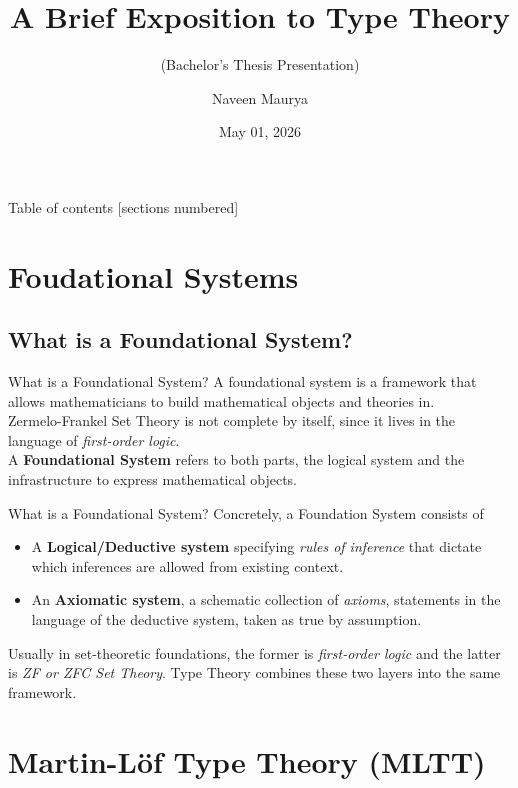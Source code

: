\documentclass[10pt, aspectratio=43]{beamer}
\title{A Brief Exposition to Type Theory}
\subtitle{(Bachelor's Thesis Presentation)}
\date{May 01, 2026}
\author{Naveen Maurya}
\institute{\SMALL Advisor: Prof. Siddhartha Gadgil \\ \vspace{0.1cm} \small Indian Institute of Science }
\newcommand{\0}{\mathbf{0}}
\newcommand{\1}{\mathbf{1}}
\newcommand{\2}{\mathbf{2}}
\begin{document}
\maketitle

\begin{frame}{Table of contents}
  [sections numbered]
  \tableofcontents%
\end{frame}

\section{Foudational Systems} 
 
\subsection{What is a Foundational System?}

\begin{frame}{What is a Foundational System?}
    A foundational system is a framework that allows mathematicians to build mathematical objects and theories in.\\ 
    Zermelo-Frankel Set Theory is not complete by itself, since it lives in the language of \emph{first-order logic}.\\
    A \textbf{Foundational System} refers to both parts, the logical system and the infrastructure to express mathematical objects. \\
\end{frame}

\begin{frame}{What is a Foundational System?}
  Concretely, a Foundation System consists of
  \begin{itemize}
    \item A \textbf{Logical/Deductive system} specifying \emph{rules of inference} that dictate which inferences are
      allowed from existing context.
    \item An \textbf{Axiomatic system}, a schematic collection of \emph{axioms}, statements in the language of the deductive system,
      taken as true by assumption.
  \end{itemize}
  Usually in set-theoretic foundations, the former is \emph{first-order logic} and the latter is \emph{ZF or ZFC Set Theory}.
  Type Theory combines these two layers into the same framework.
\end{frame}

\section{Martin-L\"of Type Theory (MLTT)}
\end{document}

